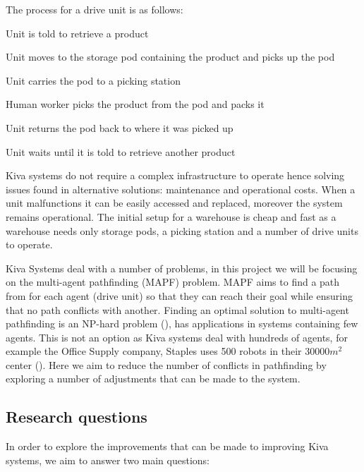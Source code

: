 \documentclass[a4paper,11pt]{article}
\begin{document}
\noindent The process for a drive unit is as follows:

\begin{compactenum}
	\item Unit is told to retrieve a product
	\item Unit moves to the storage pod containing the product and picks up the pod
	\item Unit carries the pod to a picking station
	\item Human worker picks the product from the pod and packs it
	\item Unit returns the pod back to where it was picked up
	\item Unit waits until it is told to retrieve another product
\end{compactenum}

\noindent Kiva systems do not require a complex infrastructure to operate hence solving issues found in alternative solutions: maintenance and operational costs. When a unit malfunctions it can be easily accessed and replaced, moreover the system remains operational. The initial setup for a warehouse is cheap and fast as a warehouse needs only storage pods, a picking station and a number of drive units to operate.


Kiva Systems deal with a number of problems, in this project we will be focusing on the multi-agent pathfinding (MAPF) problem. MAPF aims to find a path from for each agent (drive unit) so that they can reach their goal while ensuring that no path conflicts with another. Finding an optimal solution to multi-agent pathfinding is an NP-hard problem (\cite{yu2013structure}), has applications in systems containing few agents. This is not an option as Kiva systems deal with hundreds of agents, for example the Office Supply company, Staples uses 500 robots in their 30000$m^{2}$ center (\cite{guizzo2008three}). Here we aim to reduce the number of conflicts in pathfinding by exploring a number of adjustments that can be made to the system.

\subsection{Research questions}
In order to explore the improvements that can be made to improving Kiva systems, we aim to answer two main questions:
\end{document}
